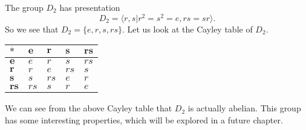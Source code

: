 \begin{example}
    The group $D_2$ has presentation
    \[
        D_2 = \langle r, s \vert r^2 = s^2 = e, rs = sr \rangle.
    \]
    So we see that $D_2 = \{e, r, s, rs\}$. Let us look at the Cayley table of $D_2$.

    \begin{table}[H]
        \centering
        \begin{tabular}{|l|l|l|l|l|}
            \hline
            $\boldsymbol{\ast}$ & $\boldsymbol{e}$ & $\boldsymbol{r}$ & $\boldsymbol{s}$ & $\boldsymbol{rs}$ \\ \hline
            $\boldsymbol{e}$ & $e$ & $r$ & $s$ & $rs$ \\ \hline
            $\boldsymbol{r}$ & $r$ & $e$ & $rs$ & $s$ \\ \hline
            $\boldsymbol{s}$ & $s$ & $rs$ & $e$ & $r$ \\ \hline
            $\boldsymbol{rs}$ & $rs$ & $s$ & $r$ & $e$ \\ \hline
        \end{tabular}
    \end{table}

    We can see from the above Cayley table that $D_2$ is actually abelian. This group has some interesting properties, which will be explored in a future chapter.
\end{example}

